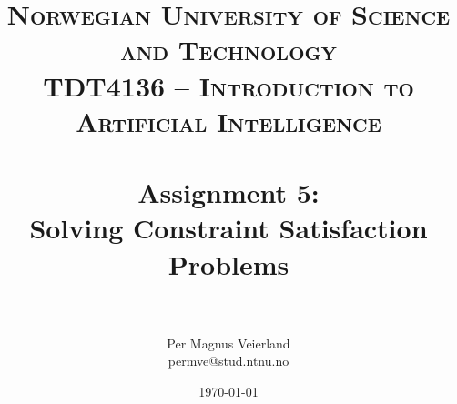 

\usepackage{float}
\usepackage{subfig}

\title{
\normalfont \normalsize
\textsc{Norwegian University of Science and Technology\\TDT4136 -- Introduction to Artificial Intelligence} \\ [25pt]
\horrule{0.5pt} \\[0.2cm]
\huge Assignment 5:\\ Solving Constraint Satisfaction Problems\\
\horrule{2pt} \\[0.3cm]
}

\author{Per Magnus Veierland\\permve@stud.ntnu.no}

\date{\normalsize\today}




\maketitle

